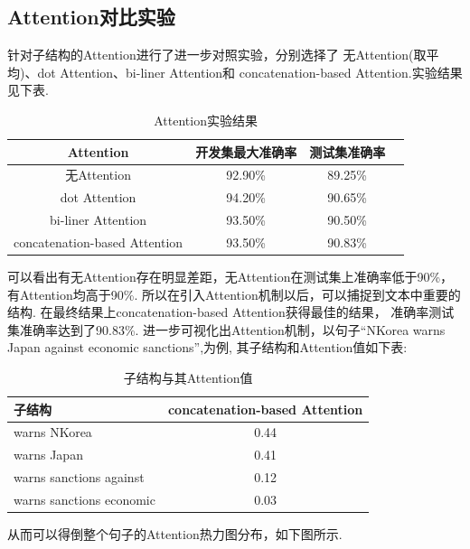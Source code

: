 \documentclass[bachelor,adobefonts]{jnuthesis}
\begin{document}
\subsection{Attention对比实验}
针对子结构的Attention进行了进一步对照实验，分别选择了
无Attention(取平均)、dot Attention、bi-liner Attention和
concatenation-based Attention.实验结果见下表.

\begin{table}[h!]
  \centering
  \begin{tabular}{cccc}
    \toprule
    \textbf{Attention} & \textbf{开发集最大准确率} & \textbf{测试集准确率} \\
    \midrule
    无Attention & 92.90\% & 89.25\% \\
    dot Attention & 94.20\% & 90.65\% \\ 
    bi-liner Attention & 93.50\% & 90.50\% \\
    concatenation-based Attention & 93.50\% & 90.83\% \\
    \bottomrule
  \end{tabular}
  \caption{Attention实验结果}
\end{table}

可以看出有无Attention存在明显差距，无Attention在测试集上准确率低于90\%，
有Attention均高于90\%.
所以在引入Attention机制以后，可以捕捉到文本中重要的结构.
在最终结果上concatenation-based Attention获得最佳的结果，
准确率测试集准确率达到了90.83\%.
进一步可视化出Attention机制，以句子“NKorea warns Japan against economic sanctions”,为例,
其子结构和Attention值如下表:

\begin{table}[h!]
  \centering
  \begin{tabular}{lc}
    \toprule
    \textbf{子结构} & \textbf{concatenation-based Attention} \\
    \midrule
    warns NKorea & 0.44 \\ 
    warns Japan & 0.41 \\
    warns sanctions against & 0.12 \\
    warns sanctions economic & 0.03 \\
    \bottomrule
  \end{tabular}
  \caption{子结构与其Attention值}
\end{table}

从而可以得倒整个句子的Attention热力图分布，如下图所示.

\end{document}
